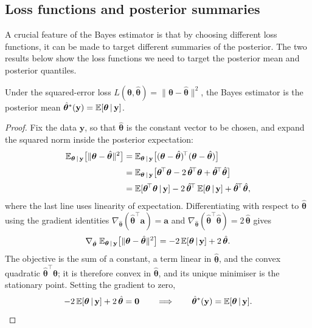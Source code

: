 \subsection{Loss functions and posterior summaries}
\label{sec:loss-summaries}

A crucial feature of the Bayes estimator is that by choosing different loss functions, 
it can be made to target different summaries of the posterior.
The two results below show the loss functions we need to target the posterior mean and posterior quantiles.  

\begin{proposition}
\label{prop:squared-error}
Under the squared-error loss
$L(\bm{\theta}, \hat{\bm{\theta}}) =
\|\bm{\theta} - \hat{\bm{\theta}}\|^2$, the Bayes estimator is the
posterior mean $\hat{\bm{\theta}}^{*}(\mathbf{y}) =
\mathbb{E}[\bm{\theta} \,|\, \mathbf{y}]$.
\end{proposition}

\begin{proof}
Fix the data $\mathbf{y}$, so that $\hat{\bm{\theta}}$ is the constant
vector to be chosen, and expand the squared norm inside the posterior
expectation:
%
\begin{align}
  \mathbb{E}_{\bm{\theta} \,|\, \mathbf{y}}
  \big[\|\bm{\theta} - \hat{\bm{\theta}}\|^2\big]
  &= \mathbb{E}_{\bm{\theta} \,|\, \mathbf{y}}
     \big[(\bm{\theta} - \hat{\bm{\theta}})^{\!\top}
     (\bm{\theta} - \hat{\bm{\theta}})\big]
   \\[2pt]
  &= \mathbb{E}_{\bm{\theta} \,|\, \mathbf{y}}
     \big[\bm{\theta}^{\!\top}\bm{\theta}
     - 2\,\hat{\bm{\theta}}^{\!\top}\bm{\theta}
     + \hat{\bm{\theta}}^{\!\top}\hat{\bm{\theta}}\big]
   \\[2pt]
  &= \mathbb{E}[\bm{\theta}^{\!\top}\bm{\theta} \,|\, \mathbf{y}]
     - 2\,\hat{\bm{\theta}}^{\!\top}\,
       \mathbb{E}[\bm{\theta} \,|\, \mathbf{y}]
     + \hat{\bm{\theta}}^{\!\top}\hat{\bm{\theta}},
\end{align}
%
where the last line uses linearity of expectation. Differentiating with respect to $\hat{\bm{\theta}}$ using the gradient identities
$\nabla_{\hat{\bm{\theta}}}(\hat{\bm{\theta}}^{\!\top}\mathbf{a})
= \mathbf{a}$ and
$\nabla_{\hat{\bm{\theta}}}
(\hat{\bm{\theta}}^{\!\top}\hat{\bm{\theta}}) = 2\,\hat{\bm{\theta}}$ gives
%
\begin{equation}
  \nabla_{\hat{\bm{\theta}}}\;
  \mathbb{E}_{\bm{\theta} \,|\, \mathbf{y}}
  \big[\|\bm{\theta} - \hat{\bm{\theta}}\|^2\big]
  = -2\,\mathbb{E}[\bm{\theta} \,|\, \mathbf{y}]
  + 2\,\hat{\bm{\theta}}.
\end{equation}
%
The objective is the sum of a constant, a term linear in
$\hat{\bm{\theta}}$, and the convex quadratic
$\hat{\bm{\theta}}^{\!\top}\hat{\bm{\theta}}$; it is therefore convex
in $\hat{\bm{\theta}}$, and its unique minimiser is the stationary
point. Setting the gradient to zero,
%
\begin{equation}
  -2\,\mathbb{E}[\bm{\theta} \,|\, \mathbf{y}]
  + 2\,\hat{\bm{\theta}} = \mathbf{0}
  \qquad\Longrightarrow\qquad
  \hat{\bm{\theta}}^{*}(\mathbf{y})
  = \mathbb{E}[\bm{\theta} \,|\, \mathbf{y}].
\end{equation}
\end{proof}

